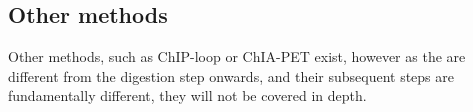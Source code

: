 



\subsection{Other methods}\label{sec:other3c}

Other methods, such as ChIP-loop or ChIA-PET exist, however as the are
different from the digestion step onwards, and their subsequent steps are
fundamentally different, they will not be covered in depth.




%
%
%
%
%
%





